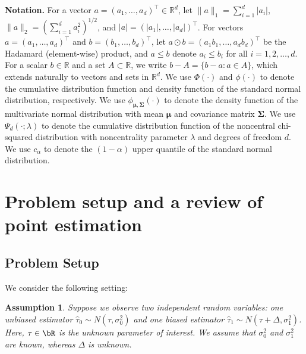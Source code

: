 \documentclass[11pt]{article}
\newcommand{\htau}{\widehat\tau}
\numberwithin{equation}{section}
\newtheorem{assumption}{Assumption}[section]
\theoremstyle{definition}
\begin{document}
\textbf{Notation.} For a vector $a = (a_1,\ldots,a_d)^\top \in \mathbb{R}^d$, let $\lVert a \rVert_1 = \sum_{i=1}^d \lvert a_i \rvert$, $\lVert a \rVert_2 = ( \sum_{i=1}^d a_i^2 )^{1/2}$, and $\lvert a \rvert = (\lvert a_1 \rvert, \ldots, \lvert a_d \rvert)^\top$. For vectors $a = (a_1,\ldots,a_d)^\top$ and $b = (b_1,\ldots,b_d)^\top$, let $a \odot b = (a_1 b_1, \ldots, a_d b_d)^\top$ be the Hadamard  (element-wise) product, and $a \le b$ denote $a_i \le b_i$ for all $i=1,2,\ldots,d$. For a scalar $b \in \mathbb{R}$ and a set $A \subset \mathbb{R}$, we write
$b - A = \{b - a : a \in A\}$, which extends naturally to vectors and sets in $\mathbb{R}^d$. We use $\Phi(\cdot)$ and $\phi(\cdot)$ to denote the cumulative distribution function and density function of the standard normal distribution, respectively. We use $\phi_{\bm{\mu}, \bm{\Sigma}}(\cdot)$ to denote the density function of the multivariate normal distribution with mean $\bm{\mu}$ and covariance matrix $\bm{\Sigma}$. We use $\Psi_d(\cdot; \lambda)$ to denote the cumulative distribution function of the noncentral chi-squared distribution with noncentrality parameter $\lambda$ and degrees of freedom $d$. We use $c_{\alpha}$ to denote the $(1-\alpha)$ upper quantile of the standard normal distribution.


\section{Problem setup and a review of point estimation}\label{sec:setup}

\subsection{Problem Setup}

We consider the following setting:
\begin{assumption}\label{ass:normal}
  Suppose we observe two independent random variables: one unbiased estimator $\htau_0 \sim N(\tau, \sigma_0^2)$ and one biased estimator $\htau_1 \sim N(\tau + \Delta, \sigma_1^2)$. Here, $\tau \in \bR$ is the unknown parameter of interest. We assume that $\sigma_0^2$ and $\sigma_1^2$ are known, whereas $\Delta$ is unknown.
\end{assumption}
\end{document}
